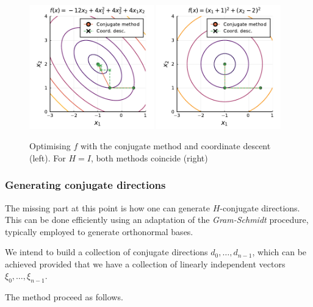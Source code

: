 \begin{figure}
	\includegraphics[width=0.48\textwidth]{part_2/chapter_6/figures/coord_conj_H.pdf}
	\hfill
	\includegraphics[width=0.48\textwidth]{part_2/chapter_6/figures/coord_conj_I.pdf}
	\caption{Optimising $f$ with the conjugate method and coordinate descent (left). For $H=I$, both methods coincide (right)} \label{fig:coord_conjugate}
\end{figure}


  
\subsubsection{Generating conjugate directions}

The missing part at this point is how one can generate $H$-conjugate directions. This can be done efficiently using an adaptation of the \emph{Gram-Schmidt} procedure, typically employed to generate orthonormal bases. 

We intend to build a collection of conjugate directions $d_0, \dots, d_{n-1}$, which can be achieved provided that we have a collection of linearly independent vectors $\xi_0,\dots,\xi_{n-1}$.

The method proceed as follows. 

